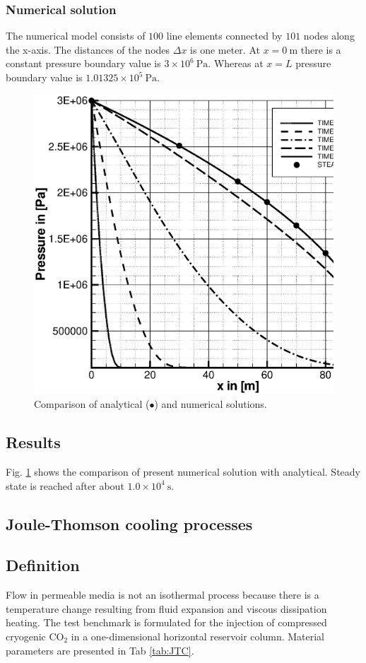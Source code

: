 \subsubsection{Numerical solution}
The numerical model consists of $100$ line elements connected by $101$ nodes along the x-axis. The distances of the nodes $\Delta x$ is one meter. At $x=0~\mathrm {m}$ there is a constant pressure boundary value is $3 \times 10^6~\mathrm {Pa}$. Whereas at $x=L$ pressure boundary value is $1.01325 \times 10^5~\mathrm {Pa}$.
\begin{figure}
\centering
\includegraphics[scale=0.3]{PART_II/G/gas_flow_new.eps}
\caption{\label{fig:air_steady}Comparison of analytical ($\bullet$) and numerical solutions.}
\end{figure}
\subsection{Results}
Fig. \ref{fig:air_steady} shows the comparison of present numerical solution with analytical. Steady state is reached after about $1.0\times10^4~\mathrm {s}$.
\subsection{Joule-Thomson cooling processes}
\label{bmt:Joule-Thomson_processes}
\subsection{Definition}
Flow in permeable media is not an isothermal process because there is a temperature change resulting from fluid expansion and viscous dissipation heating. The test benchmark is formulated for the injection of compressed cryogenic $\mathrm {CO_2}$ in a one-dimensional horizontal reservoir column. Material parameters are presented in Tab \ref{tab:JTC}.
